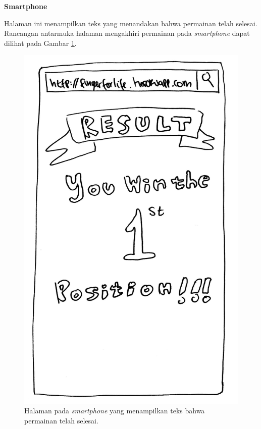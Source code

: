 \begin{enumerate}
	\textbf{Smartphone}
	
	Halaman ini menampilkan teks yang menandakan bahwa permainan telah selesai. Rancangan antarmuka halaman mengakhiri permainan pada \textit{smartphone} dapat dilihat pada Gambar \ref{fig:mob6_win}.
	
\begin{figure}[H]
	\centering
	\includegraphics[scale=0.1]{Gambar/mob6_win}
	\caption{Halaman pada \textit{smartphone} yang menampilkan teks bahwa permainan telah selesai.}
	\label{fig:mob6_win}
\end{figure}
	
\end{enumerate}

